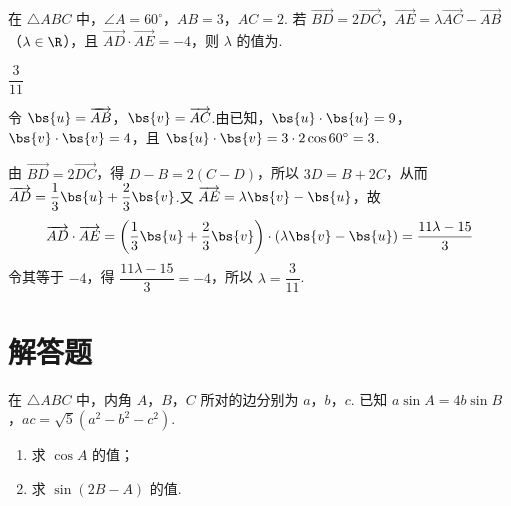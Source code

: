 \begin{problem}
在 \(\triangle ABC\) 中，\(\angle A=60^\circ\)，\(AB=3\)，\(AC=2\). 若 \(\overrightarrow{BD}=2\overrightarrow{DC}\)，\(\overrightarrow{AE}=\lambda\overrightarrow{AC}-\overrightarrow{AB}\)（\(\lambda\in\R\)），且 \(\overrightarrow{AD}\cdot\overrightarrow{AE}=-4\)，则 \(\lambda\) 的值为\fillinblank{}.
\end{problem}

\begin{answer}
\(\dfrac{3}{11}\)
\end{answer}

\begin{solution}
令 \(\bs{u}=\overrightarrow{AB}\)，\(\bs{v}=\overrightarrow{AC}\).由已知，\(\bs{u}\cdot\bs{u}=9\)，\(\bs{v}\cdot\bs{v}=4\)，且 \(\bs{u}\cdot\bs{v}=3\cdot2\cos60^\circ=3\).

由 \(\overrightarrow{BD}=2\overrightarrow{DC}\)，得 \(D-B=2(C-D)\)，所以 \(3D=B+2C\)，从而 \(\overrightarrow{AD}=\dfrac13\bs{u}+\dfrac23\bs{v}\).又 \(\overrightarrow{AE}=\lambda\bs{v}-\bs{u}\)，故
\[
\overrightarrow{AD}\cdot\overrightarrow{AE}=\left(\dfrac13\bs{u}+\dfrac23\bs{v}\right)\cdot\left(\lambda\bs{v}-\bs{u}\right)=\dfrac{11\lambda-15}{3}
\]
令其等于 \(-4\)，得 \(\dfrac{11\lambda-15}{3}=-4\)，所以 \(\lambda=\dfrac3{11}\).
\end{solution}

\section{解答题}

\begin{problem}
在 \(\triangle ABC\) 中，内角 \(A\)，\(B\)，\(C\) 所对的边分别为 \(a\)，\(b\)，\(c\). 已知 \(a\sin A=4b\sin B\)，\(ac=\sqrt5\left(a^2-b^2-c^2\right)\).

\begin{enumerate}
\item 求 \(\cos A\) 的值；
\item 求 \(\sin(2B-A)\) 的值.
\end{enumerate}
\end{problem}

